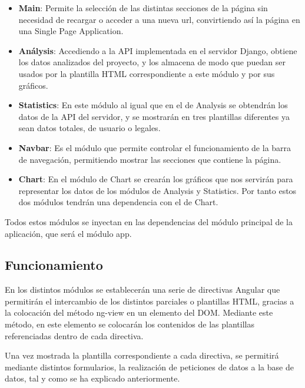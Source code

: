 \documentclass[a4paper, spanish, 12pt]{book}
\begin{document}
\begin{itemize}

\item \textbf{Main}: Permite la selecci\'on de las distintas secciones de la p\'agina
sin necesidad de recargar o acceder a una nueva url, convirtiendo as\'i la p\'agina
en una Single Page Application.

\item \textbf{An\'alysis}: Accediendo a la API implementada en el servidor Django,
obtiene los datos analizados del proyecto, y los almacena de modo que puedan ser usados
por la plantilla HTML correspondiente a este m\'odulo y por sus gr\'aficos.

\item \textbf{Statistics}: En este m\'odulo al igual que en el de Analysis se
obtendr\'an los datos de la API del servidor, y se mostrar\'an en tres plantillas
diferentes ya sean datos totales, de usuario o legales.

\item \textbf{Navbar}: Es el m\'odulo que permite controlar el funcionamiento de
la barra de navegaci\'on, permitiendo mostrar las secciones que contiene la p\'agina.

\item \textbf{Chart}: En el m\'odulo de Chart se crear\'an los gr\'aficos que nos
servir\'an para representar los datos de los m\'odulos de Analysis y Statistics.
Por tanto estos dos m\'odulos tendr\'an una dependencia con el de Chart.

\end{itemize}

Todos estos m\'odulos se inyectan en las dependencias del m\'odulo principal de
la aplicaci\'on, que ser\'a el m\'odulo app.

\subsection{Funcionamiento}
\label{subsec:angular_funcionamiento}

En los distintos m\'odulos se establecer\'an una serie de directivas Angular
que permitir\'an el intercambio de los distintos parciales o plantillas HTML,
gracias a la colocaci\'on del m\'etodo ng-view en un elemento del DOM.
Mediante este m\'etodo, en este elemento se colocar\'an los contenidos de las
plantillas referenciadas dentro de cada directiva.

Una vez mostrada la plantilla correspondiente a cada directiva, se permitir\'a
mediante distintos formularios, la realizaci\'on de peticiones de datos a la base
de datos, tal y como se ha explicado anteriormente.
\end{document}
